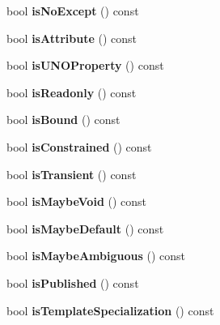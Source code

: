 \begin{DoxyCompactItemize}
\item 
\mbox{\label{class_member_def_a2a786930d5345730acc353c5d4835dcc}} 
bool {\bfseries is\+No\+Except} () const
\item 
\mbox{\label{class_member_def_af2403a4a07115bbced8c9cfd33bd50a9}} 
bool {\bfseries is\+Attribute} () const
\item 
\mbox{\label{class_member_def_a3991820d6d7e743a58f2d4a5069a3df1}} 
bool {\bfseries is\+U\+N\+O\+Property} () const
\item 
\mbox{\label{class_member_def_a1955d31ca9c1d03db4459791e11e1f5c}} 
bool {\bfseries is\+Readonly} () const
\item 
\mbox{\label{class_member_def_a11ec11e49e8c359df0fcf98a202b06f2}} 
bool {\bfseries is\+Bound} () const
\item 
\mbox{\label{class_member_def_af67ca0665caae9df8404c246c802b7de}} 
bool {\bfseries is\+Constrained} () const
\item 
\mbox{\label{class_member_def_aeef845f53a813499a6d58fbdb154700d}} 
bool {\bfseries is\+Transient} () const
\item 
\mbox{\label{class_member_def_a2b49e1521c3fb9b5b90eaf6f74c9546d}} 
bool {\bfseries is\+Maybe\+Void} () const
\item 
\mbox{\label{class_member_def_ac39d2a5d88f324861ea192aa1f314d05}} 
bool {\bfseries is\+Maybe\+Default} () const
\item 
\mbox{\label{class_member_def_a2dfc204182437b85afa8cd3749bf8536}} 
bool {\bfseries is\+Maybe\+Ambiguous} () const
\item 
\mbox{\label{class_member_def_a75002a926943a33424a5f6a0c5f5a658}} 
bool {\bfseries is\+Published} () const
\item 
\mbox{\label{class_member_def_ae4aedc7064bfc58fb68c3579619c87a5}} 
bool {\bfseries is\+Template\+Specialization} () const

\end{DoxyCompactItemize}
